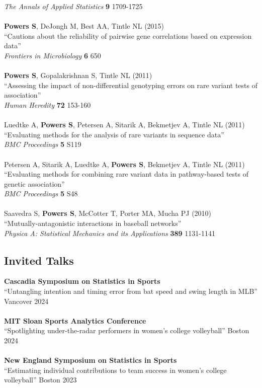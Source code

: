 \documentclass{article}
\begin{document}
{\it The Annals of Applied Statistics} {\bf 9} 1709-1725\\
~\\
{\bf Powers S}, DeJongh M, Best AA, Tintle NL (2015)\\
``Cautions about the reliability of pairwise gene correlations based on expression data''\\
{\it Frontiers in Microbiology} {\bf 6} 650\\
~\\
{\bf Powers S}, Gopalakrishnan S, Tintle NL (2011)\\
``Assessing the impact of non-differential genotyping errors on rare variant tests of association''\\
{\it Human Heredity} {\bf 72} 153-160\\
~\\
Luedtke A, {\bf Powers S}, Petersen A, Sitarik A, Bekmetjev A, Tintle NL (2011)\\
``Evaluating methods for the analysis of rare variants in sequence data''\\
{\it BMC Proceedings} {\bf 5} S119\\
~\\
Petersen A, Sitarik A, Luedtke A, {\bf Powers S}, Bekmetjev A, Tintle NL (2011)\\
``Evaluating methods for combining rare variant data in pathway-based tests of genetic association''\\
{\it BMC Proceedings} {\bf 5} S48\\
~\\
Saavedra S, {\bf Powers S}, McCotter T, Porter MA, Mucha PJ (2010)\\
``Mutually-antagonistic interactions in baseball networks''\\
{\it Physica A: Statistical Mechanics and its Applications} {\bf 389} 1131-1141

\subsection*{\sc Invited Talks}

{\bf Cascadia Symposium on Statistics in Sports}\\
``Untangling intention and timing error from bat speed and swing length in MLB'' \hfill Vancover 2024\\
~\\
{\bf MIT Sloan Sports Analytics Conference}\\
``Spotlighting under-the-radar performers in women's college volleyball'' \hfill Boston 2024\\
~\\
{\bf New England Symposium on Statistics in Sports}\\
``Estimating individual contributions to team success in women's college volleyball'' \hfill Boston 2023
\end{document}
